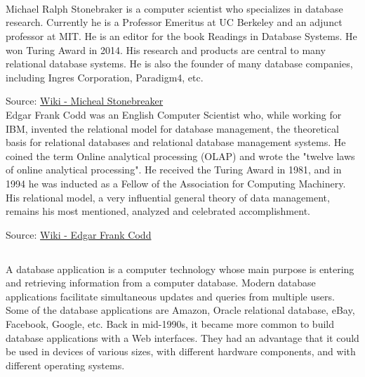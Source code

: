 \documentclass[12pt]{article}
\begin{document}
\maketitle


\section{}
\subsection{} \\
Michael Ralph Stonebraker is a computer scientist who specializes in database research. Currently he is a Professor Emeritus at UC Berkeley and an adjunct professor at MIT. He is an editor for the book Readings in Database Systems.
He won Turing Award in 2014. His research and products are central to many relational database systems. He is also the founder of many database companies, including Ingres Corporation, Paradigm4, etc.

Source: \href{https://en.wikipedia.org/wiki/Michael_Stonebraker}{Wiki - Micheal Stonebreaker} \\

Edgar Frank Codd was an English Computer Scientist who, while working for IBM, invented the relational model for database management, the theoretical basis for relational databases and relational database management systems. He coined the term Online analytical processing (OLAP) and wrote the "twelve laws of online analytical processing". He received the Turing Award in 1981, and in 1994 he was inducted as a Fellow of the Association for Computing Machinery. His relational model, a very influential general theory of data management, remains his most mentioned, analyzed and celebrated accomplishment.

Source: \href{https://en.wikipedia.org/wiki/Edgar_F._Codd}{Wiki - Edgar Frank Codd} \\

\subsection{}
A database application is a computer technology whose main purpose is entering and retrieving information from a computer database. Modern database applications facilitate simultaneous updates and queries from multiple users. 
Some of the database applications are Amazon, Oracle relational database, eBay, Facebook, Google, etc.
Back in mid-1990s, it became more common to build database applications with a Web interfaces. They had an advantage that it could be used in devices of various sizes, with different hardware components, and with different operating systems.
\end{document}
